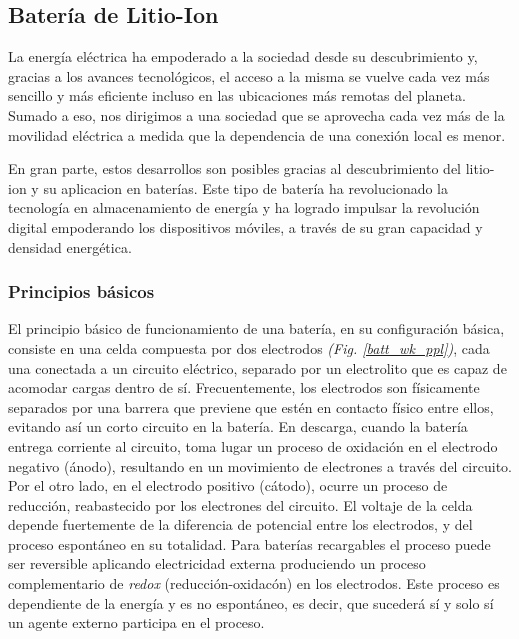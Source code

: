 \documentclass[10pt,a4paper]{article}
\begin{document}
\subsection{Batería de Litio-Ion}

La energía eléctrica ha empoderado a la sociedad desde su descubrimiento y,
gracias a los avances tecnológicos, el acceso a la misma se vuelve cada vez más
sencillo y más eficiente incluso en las ubicaciones más remotas del planeta.
Sumado a eso, nos dirigimos a una sociedad que se aprovecha cada vez más de la
movilidad eléctrica a medida que la dependencia de una conexi\'on local es
menor.

En gran parte, estos desarrollos son posibles gracias al descubrimiento del
litio-ion y su aplicacion en baterías. Este tipo de batería ha revolucionado la
tecnolog\'ia en almacenamiento de energ\'ia y ha logrado impulsar la
revoluci\'on digital empoderando los dispositivos móviles, a trav\'es de su gran
capacidad y densidad energ\'etica.

\subsubsection{Principios b\'asicos}

El principio básico de funcionamiento de una batería, en su configuraci\'on
b\'asica, consiste en una celda compuesta por dos electrodos 
\emph{(Fig. \ref{batt_wk_ppl})}, cada una conectada a un circuito el\'ectrico, 
separado por un electrolito que es capaz de acomodar cargas dentro de sí. 
Frecuentemente, los electrodos son f\'isicamente separados por una barrera que 
previene que estén en contacto físico entre ellos, evitando así un corto 
circuito en la batería. En descarga, cuando la bater\'ia entrega corriente al 
circuito, toma lugar un proceso de oxidación en el electrodo negativo (\'anodo), 
resultando en un movimiento de electrones a trav\'es del circuito. Por el otro 
lado, en el electrodo positivo (c\'atodo), ocurre un proceso de reducción, 
reabastecido por los electrones del circuito. El voltaje de la celda depende 
fuertemente de la diferencia de potencial entre los electrodos, y del proceso 
espont\'aneo en su totalidad. Para baterías recargables el proceso puede ser 
reversible aplicando electricidad externa produciendo un proceso complementario 
de \emph{redox} (reducci\'on-oxidac\'on) en los electrodos. Este proceso es 
dependiente de la energ\'ia y es no espont\'aneo, es decir, que sucederá s\'i y 
solo s\'i un agente externo participa en el proceso.
\end{document}
